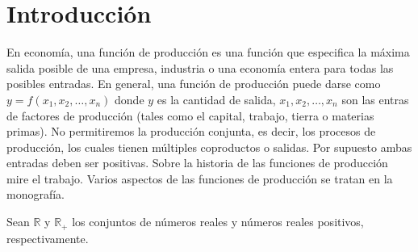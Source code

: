 \documentclass[a4paper,fleqn]{cas-dc}
\begin{document}
\maketitle

\section{Introducción}
En economía, una función de producción es una función que especifica la máxima salida posible de una empresa, industria o una economía entera  para todas las posibles entradas. En general, una función de producción puede darse como $y=f\left(x_{1},x_{2},\ldots,x_{n}\right)$ donde $y$ es la cantidad de salida, $x_{1},x_{2},\ldots,x_{n}$ son las entras de factores de producción (tales como el capital, trabajo, tierra o materias primas). No permitiremos la producción conjunta, es decir, los procesos de producción, los cuales tienen múltiples coproductos o salidas. Por supuesto ambas entradas deben ser positivas. Sobre la historia de las funciones de producción mire el trabajo. Varios aspectos de las funciones de producción se tratan en la monografía.

Sean $\mathds{R}$ y $\mathds{R}_{+}$ los conjuntos de números reales y números reales positivos, respectivamente.
\newtheorem{definition}{Definición}
\end{document}

